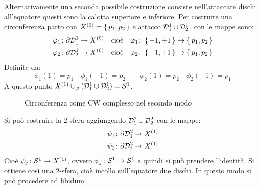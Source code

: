 \begin{example}
  Alternativamente una seconda possibile costruzione consiste nell'attaccare
  dischi all'equatore questi sono la calotta superiore e inferiore. Per
  costruire una circonferenza parto con $ X^{(0)} = \set{p_1, p_2} $ e attacco
  $ \mathcal{D}^{1}_1 \cup \mathcal{D}^{1}_2 $, con le mappe sono:
  \begin{gather*}
    \varphi_1 \colon \partial \mathcal{D}^{1}_1 \to X^{(0)} \quad \text{cioè} \quad \varphi_1 \colon \set{-1, +1} \to \set{p_1, p_2} \\
    \varphi_2 \colon \partial \mathcal{D}^{1}_2 \to X^{(0)} \quad \text{cioè} \quad \varphi_2 \colon \set{-1, +1} \to \set{p_1, p_2}
  \end{gather*}
  Definite da:
  \[
    \phi_1(1) = p_1 \quad \phi_1(-1) = p_2 \qquad  \phi_2(1) = p_2 \quad \phi_2(-1) = p_1
  \]
  A questo punto $ X^{(1)} \cup_\varphi (\mathcal{D}^{1}_1 \cup \mathcal{D}^{1}_2) = \mathcal{S}^{1} $.
  \begin{figure}[htbp]
    \centering
    \caption{Circonferenza come CW complesso nel secondo modo}
  \end{figure}

  \noindent
  Si può costruire la $ 2 $-sfera aggiungendo $ \mathcal{D}^{2}_1 \cup \mathcal{D}^{2}_2 $ con le mappe:
  \begin{gather*}
    \psi_1 \colon \partial \mathcal{D}^{2}_1 \to X^{(1)} \\
    \psi_2 \colon \partial \mathcal{D}^{2}_2 \to X^{(1)}
  \end{gather*}
  Cioè $ \psi_j \colon \mathcal{S}^{1} \to X^{(1)} $, ovvero
  $ \psi_j \colon \mathcal{S}^{1} \to \mathcal{S}^{1} $ e quindi si può prendere l'identità. Si ottiene
  così una $ 2 $-sfera, cioè incollo sull'equatore due dischi. In questo modo si
  può procedere ad libidum.
\end{example}

